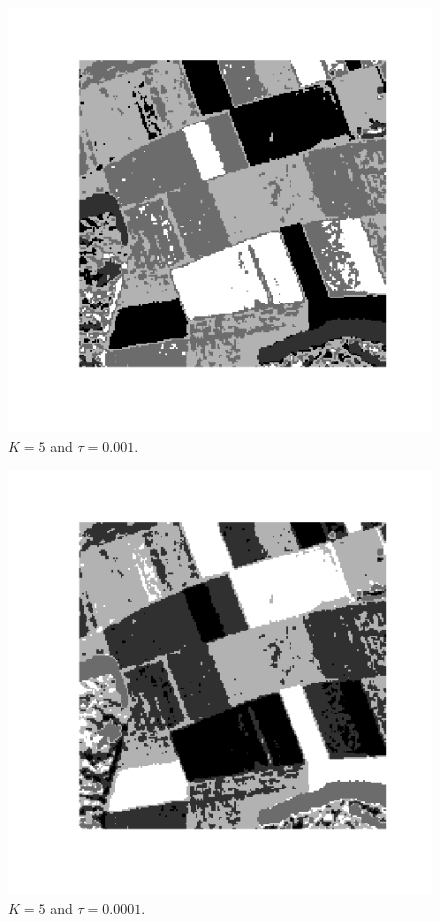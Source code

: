 \documentclass[twoside]{Homework}
\begin{document}
\begin{figure}[!ht]
  \centering
    \includegraphics[scale=0.6]{5-0001.png}
  \caption{$K=5$ and $\tau=0.001$.}
\end{figure}
\begin{figure}[!ht]
  \centering
    \includegraphics[scale=0.6]{5-00001.png}
  \caption{$K=5$ and $\tau=0.0001$.}
\end{figure}
\end{document}
